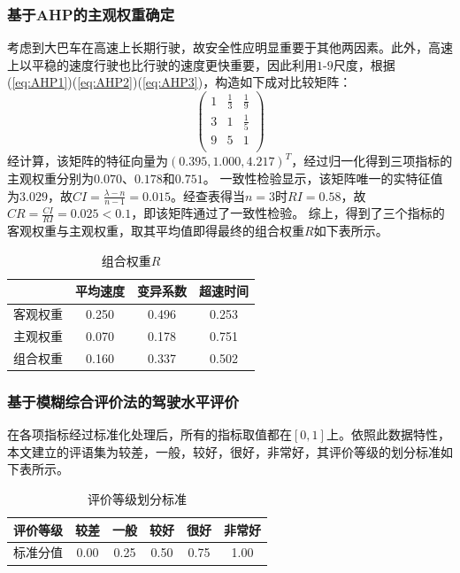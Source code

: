\documentclass[bwprint]{cumcmthesis}
\begin{document}
            \subsubsection{基于AHP的主观权重确定}
            考虑到大巴车在高速上长期行驶，故安全性应明显重要于其他两因素。此外，高速上以平稳的速度行驶也比行驶的速度更快重要，因此利用$1$-$9$尺度，根据(\ref{eq:AHP1})(\ref{eq:AHP2})(\ref{eq:AHP3})，构造如下成对比较矩阵：
            \[
            \begin{pmatrix}
                1 & \frac{1}{3} & \frac{1}{9}  \\
                3 & 1 & \frac{1}{5}  \\
                9 & 5 & 1  \\
            \end{pmatrix}
            \]
            经计算，该矩阵的特征向量为$(0.395,1.000,4.217)^T$，经过归一化得到三项指标的主观权重分别为$0.070$、$0.178$和$0.751$。
            一致性检验显示，该矩阵唯一的实特征值为$3.029$，故$CI=\frac{\lambda-n}{n-1}=0.015$。经查表得当$n=3$时$RI=0.58$，故$CR=\frac{CI}{RI}=0.025<0.1$，即该矩阵通过了一致性检验。
            综上，得到了三个指标的客观权重与主观权重，取其平均值即得最终的组合权重$R$如下表所示。
            \begin{table}[htbp]
                \centering
                \caption{组合权重$R$}
                    \begin{tabular}{|c|c|c|c|}
                    \hline
                    & 平均速度 & 变异系数 & 超速时间 \\
                    \hline
                    客观权重  & 0.250 & 0.496 & 0.253 \\
                    \hline
                    主观权重  & 0.070 & 0.178 & 0.751 \\
                    \hline
                    组合权重  & 0.160 & 0.337 & 0.502 \\
                    \hline
                    \end{tabular}
                \label{tab:eight}
              \end{table}
            \subsubsection{基于模糊综合评价法的驾驶水平评价}
            在各项指标经过标准化处理后，所有的指标取值都在$[0,1]$上。依照此数据特性，本文建立的评语集为${\text{较差，一般，较好，很好，非常好}}$，其评价等级的划分标准如下表所示。
            \begin{table}[htbp]
                \centering
                \caption{评价等级划分标准}
                    \begin{tabular}{|c|c|c|c|c|c|}
                    \hline
                    评价等级  & 较差    & 一般    & 较好    & 很好    & 非常好 \\
                    \hline
                    标准分值  & 0.00     & 0.25  & 0.50   & 0.75  & 1.00 \\
                    \hline
                    \end{tabular}
                \label{tab:nine}
            \end{table}
            
\end{document}
